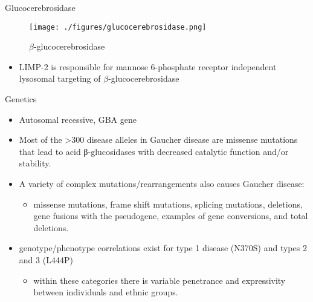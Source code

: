 \documentclass[presentation, smaller]{beamer}
\begin{document}
\begin{frame}[label={sec:orgheadline5}]{Glucocerebrosidase}
\begin{figure}[htb]
\centering
\texttt{[image: ./figures/glucocerebrosidase.png]}
\caption[block]{\label{fig:sidase}
\(\beta\)-glucocerebrosidase}
\end{figure}

\begin{itemize}
\item LIMP-2 is responsible for mannose 6-phosphate receptor
independent lysosomal targeting of \(\beta\)-glucocerebrosidase
\end{itemize}
\end{frame}

\begin{frame}[label={sec:orgheadline6}]{Genetics}
\begin{itemize}
\item Autosomal recessive, GBA gene
\item Most of the >300 disease alleles in Gaucher disease are missense
mutations that lead to acid β-glucosidases with decreased catalytic
function and/or stability.
\item A variety of complex mutations/rearrangements also causes Gaucher
disease:
\begin{itemize}
\item missense mutations, frame shift mutations, splicing mutations, deletions, gene fusions with the pseudogene, examples of gene conversions, and total deletions.
\end{itemize}
\item genotype/phenotype correlations exist for type 1 disease (N370S) and
types 2 and 3 (L444P)
\begin{itemize}
\item within these categories there is variable penetrance and
expressivity between individuals and ethnic groups.
\end{itemize}
\end{itemize}
\end{frame}
\end{document}
